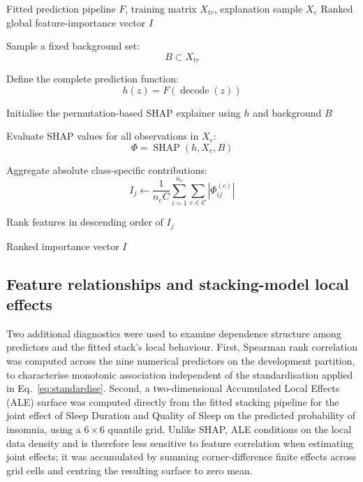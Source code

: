 \documentclass[a4paper,fleqn]{cas-dc}
\begin{document}
\begin{algorithm}[tbp]
\caption{Permutation-SHAP Procedure for Global Model Auditing}
\label{alg:shap}
\small
\setlength{\abovedisplayskip}{3pt}
\setlength{\belowdisplayskip}{3pt}
\begin{algorithmic}[1]

\Require Fitted prediction pipeline $F$, training matrix $X_{tr}$,
explanation sample $X_e$
\Ensure Ranked global feature-importance vector $I$

\State Sample a fixed background set:
\[
B\subset X_{tr}
\]

\State Define the complete prediction function:
\[
h(z)=F(\operatorname{decode}(z))
\]

\State Initialise the permutation-based SHAP explainer
using $h$ and background $B$

\State Evaluate SHAP values for all observations in $X_e$:
\[
\Phi=\operatorname{SHAP}(h,X_e,B)
\]


    \State Aggregate absolute class-specific contributions:
    \[
    I_j\gets
    \frac{1}{n_eC}
    \sum_{i=1}^{n_e}
    \sum_{c\in\mathcal{C}}
    \left|\Phi_{ij}^{(c)}\right|
    \]

\EndFor

\State Rank features in descending order of $I_j$

\State \Return Ranked importance vector $I$

\end{algorithmic}
\end{algorithm}

\subsection{Feature relationships and stacking-model local effects}
\label{sec:ale}
Two additional diagnostics were used to examine dependence structure among predictors and the fitted stack's local behaviour. First, Spearman rank correlation was computed across the nine numerical predictors on the development partition, to characterise monotonic association independent of the standardisation applied in Eq.~\eqref{eq:standardise}. Second, a two-dimensional Accumulated Local Effects (ALE) surface \cite{apley2020} was computed directly from the fitted stacking pipeline for the joint effect of Sleep Duration and Quality of Sleep on the predicted probability of insomnia, using a $6\times6$ quantile grid. Unlike SHAP, ALE conditions on the local data density and is therefore less sensitive to feature correlation when estimating joint effects; it was accumulated by summing corner-difference finite effects across grid cells and centring the resulting surface to zero mean.
\end{document}
